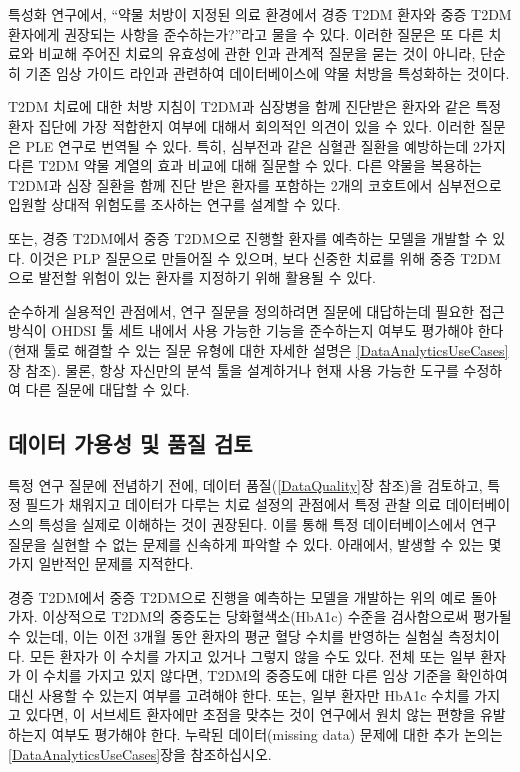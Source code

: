 \documentclass[11pt]{book}
\theoremstyle{definition}
\theoremstyle{definition}
\theoremstyle{definition}
\theoremstyle{remark}
\begin{document}
특성화 연구에서, ``약물 처방이 지정된 의료 환경에서 경증 T2DM 환자와
중증 T2DM 환자에게 권장되는 사항을 준수하는가?''라고 물을 수 있다.
이러한 질문은 또 다른 치료와 비교해 주어진 치료의 유효성에 관한 인과
관계적 질문을 묻는 것이 아니라, 단순히 기존 임상 가이드 라인과 관련하여
데이터베이스에 약물 처방을 특성화하는 것이다.

T2DM 치료에 대한 처방 지침이 T2DM과 심장병을 함께 진단받은 환자와 같은
특정 환자 집단에 가장 적합한지 여부에 대해서 회의적인 의견이 있을 수
있다. 이러한 질문은 PLE 연구로 번역될 수 있다. 특히, 심부전과 같은
심혈관 질환을 예방하는데 2가지 다른 T2DM 약물 계열의 효과 비교에 대해
질문할 수 있다. 다른 약물을 복용하는 T2DM과 심장 질환을 함께 진단 받은
환자를 포함하는 2개의 코호트에서 심부전으로 입원할 상대적 위험도를
조사하는 연구를 설계할 수 있다.

또는, 경증 T2DM에서 중증 T2DM으로 진행할 환자를 예측하는 모델을 개발할
수 있다. 이것은 PLP 질문으로 만들어질 수 있으며, 보다 신중한 치료를 위해
중증 T2DM으로 발전할 위험이 있는 환자를 지정하기 위해 활용될 수 있다.

순수하게 실용적인 관점에서, 연구 질문을 정의하려면 질문에 대답하는데
필요한 접근 방식이 OHDSI 툴 세트 내에서 사용 가능한 기능을 준수하는지
여부도 평가해야 한다(현재 툴로 해결할 수 있는 질문 유형에 대한 자세한
설명은 \ref{DataAnalyticsUseCases}장 참조). 물론, 항상 자신만의 분석
툴을 설계하거나 현재 사용 가능한 도구를 수정하여 다른 질문에 대답할 수
있다.

\subsection{데이터 가용성 및 품질 검토}\label{----}

특정 연구 질문에 전념하기 전에, 데이터 품질(\ref{DataQuality}장 참조)을
검토하고, 특정 필드가 채워지고 데이터가 다루는 치료 설정의 관점에서 특정
관찰 의료 데이터베이스의 특성을 실제로 이해하는 것이 권장된다. 이를 통해
특정 데이터베이스에서 연구 질문을 실현할 수 없는 문제를 신속하게 파악할
수 있다. 아래에서, 발생할 수 있는 몇 가지 일반적인 문제를 지적한다.

경증 T2DM에서 중증 T2DM으로 진행을 예측하는 모델을 개발하는 위의 예로
돌아 가자. 이상적으로 T2DM의 중증도는 당화혈색소(HbA1c) 수준을
검사함으로써 평가될 수 있는데, 이는 이전 3개월 동안 환자의 평균 혈당
수치를 반영하는 실험실 측정치이다. 모든 환자가 이 수치를 가지고 있거나
그렇지 않을 수도 있다. 전체 또는 일부 환자가 이 수치를 가지고 있지
않다면, T2DM의 중증도에 대한 다른 임상 기준을 확인하여 대신 사용할 수
있는지 여부를 고려해야 한다. 또는, 일부 환자만 HbA1c 수치를 가지고
있다면, 이 서브세트 환자에만 초점을 맞추는 것이 연구에서 원치 않는
편향을 유발하는지 여부도 평가해야 한다. 누락된 데이터(missing data)
문제에 대한 추가 논의는 \ref{DataAnalyticsUseCases}장을 참조하십시오.
\end{document}
